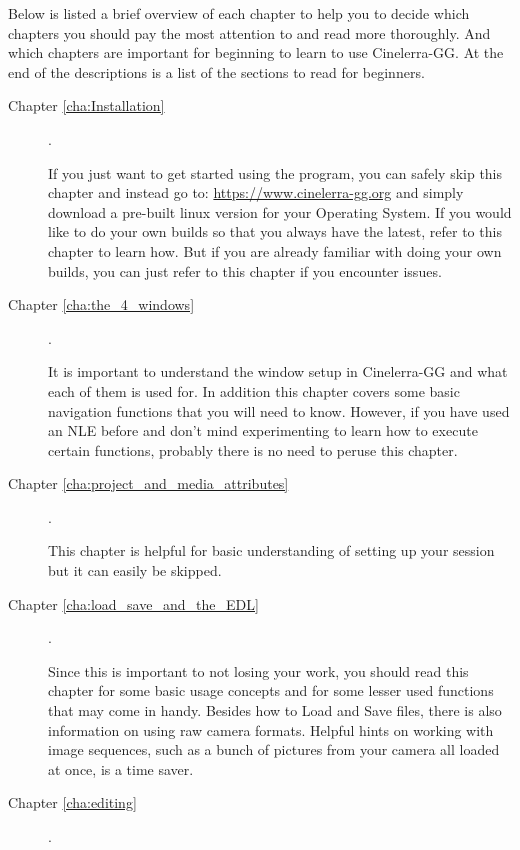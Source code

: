 Below is listed a brief overview of each chapter to help you to decide which chapters you should pay the most attention to and read more thoroughly. 
And which chapters are important for beginning to learn to use Cinelerra-GG. At the end of the descriptions is a list of the sections to read for beginners.

\begin{description}
    \item[Chapter \ref{cha:Installation} ] .

        If you just want to get started using the program, you can safely skip this chapter and instead go to:
        \url{https://www.cinelerra-gg.org}
        and simply download a pre-built linux version for your Operating System. If you would like to do your own builds so that you always have the latest, refer to this chapter to learn how. 
        But if you are already familiar with doing your own builds, you can just refer to this chapter if you encounter issues.
    \item[Chapter \ref{cha:the_4_windows} ] .

        It is important to understand the window setup in Cinelerra-GG and what each of them is used for. 
        In addition this chapter covers some basic navigation functions that you will need to know. 
        However, if you have used an NLE before and don’t mind experimenting to learn how to execute certain functions, probably there is no need to peruse this chapter.
    \item[Chapter \ref{cha:project_and_media_attributes}] .

        This chapter is helpful for basic understanding of setting up your session but it can easily be skipped.

    \item[Chapter \ref{cha:load_save_and_the_EDL}] .

        Since this is important to not losing your work, you should read this chapter for some basic usage concepts and for some lesser used functions that may come in handy. 
        Besides how to Load and Save files, there is also information on using raw camera formats. 
        Helpful hints on working with image sequences, such as a bunch of pictures from your camera all loaded at once, is a time saver.

    \item[Chapter \ref{cha:editing}] .


\end{description}
